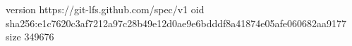 version https://git-lfs.github.com/spec/v1
oid sha256:e1c7620c3af7212a97c28b49e12d0ae9e6bdddf8a41874e05afe060682aa9177
size 349676
